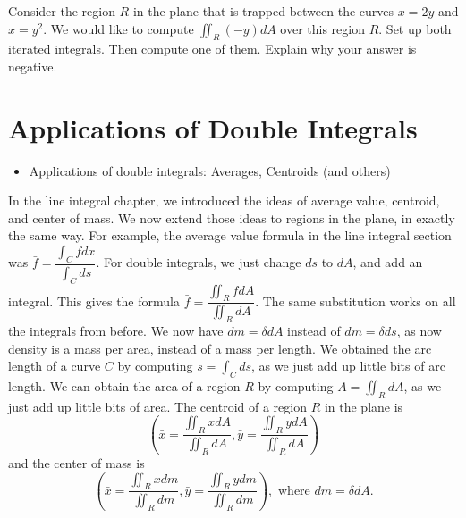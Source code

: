 %

\begin{problem*}
Consider the region $R$ in the plane that is trapped between the curves $x=2y$ and $x=y^2$.  We would like to compute $\iint_R (-y) dA$ over this region $R$.  Set up both iterated integrals. Then compute one of them. Explain why your answer is negative.
\end{problem*}


\uday
\normalsize
\section{Applications of Double Integrals}
\begin{itemize}
\item Applications of double integrals: Averages, Centroids (and others)
\end{itemize}

\vskip0.1cm

In the line integral chapter, we introduced the ideas of average value, centroid, and center of mass.  
We now extend those ideas to regions in the plane, in exactly the same way.  
For example, the average value formula in the line integral section was $\bar f = \dfrac{\int_C fdx}{\int_C ds}$. 
For double integrals, we just change $ds$ to $dA$, and add an integral.  
This gives the formula $\bar f = \dfrac{\iint_R fdA}{\iint_R dA}.$ 
The same substitution works on all the integrals from before.
We now have $dm = \delta dA$ instead of $dm=\delta ds$, as now density is a mass per area, instead of a mass per length. 
We obtained the arc length of a curve $C$ by computing $s=\int_C ds$, as we just add up little bits of arc length.  
We can obtain the area of a region $R$ by computing $A=\iint_R dA$, as we just add up little bits of area.
The centroid of a region $R$ in the plane is
$$
\left(\bar x = \frac{\iint_R x dA}{\iint_R dA}, 
\bar y = \frac{\iint_R y dA}{\iint_R dA}\right)
$$
and the center of mass is 
$$
\left(\bar x = \frac{\iint_R x  dm}{\iint_R dm}, 
\bar y = \frac{\iint_R y dm}{\iint_R dm}\right), \text{ where $dm=\delta dA$}.
$$





